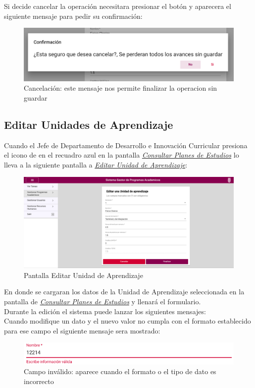 Si decide cancelar la operación necesitara presionar el botón  y aparecera el siguiente mensaje para pedir su confirmación:\\
\begin{figure}[H]
    \centering
    \hypertarget{cancelarR}{\includegraphics[width=0.7\linewidth]{images/GUA/cancelar}}
    \caption{Cancelación: este mensaje nos permite finalizar la operacion sin guardar}
    \label{cancelarR}
\end{figure}
\newpage
\subsection{Editar Unidades de Aprendizaje}
Cuando el Jefe de Departamento de Desarrollo e Innovación Curricular presiona el icono de \BtnLapiz en el recuadro azul en la pantalla \hyperlink{consultarUA}{\textit{Consultar Planes de Estudios}} lo lleva a la siguiente pantalla a \hyperlink{editarUA}{\textit{Editar Unidad de Aprendizaje}}:\\
\begin{figure}[H]
    \centering
    \hypertarget{editarUA}{\includegraphics[width=0.7\linewidth]{images/GUA/editarUA}}
    \caption{Pantalla Editar Unidad de Aprendizaje}
    \label{editarUA}
\end{figure}
En donde se cargaran los datos de la Unidad de Aprendizaje seleccionada en la pantalla de \hyperlink{consultarUA}{\textit{Consultar Planes de Estudios}}  y llenará el formulario.\\
Durante la edición el sistema puede lanzar los siguientes mensajes:\\
Cuando modifique un dato y el nuevo valor no cumpla con el formato establecido para ese campo el siguiente mensaje sera mostrado:\\
\begin{figure}[H]
    \centering
    \hypertarget{invalidoE}{\includegraphics[width=0.7\linewidth]{images/GUA/invalido}}
    \caption{Campo inválido: aparece cuando el formato o el tipo de dato es incorrecto}
    \label{invalidoE}
\end{figure}
